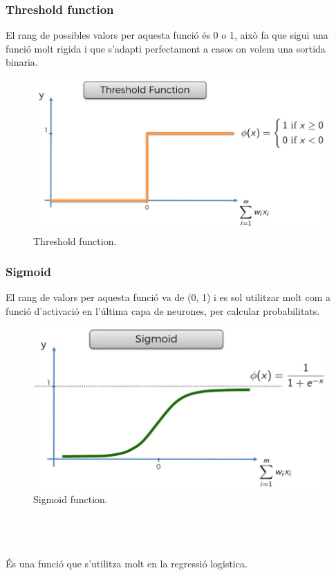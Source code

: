 \documentclass[12pt]{article}
\begin{document}
\subsubsection{Threshold function}
El rang de possibles valors per aquesta funció és 0 o 1, això fa que sigui una funció molt rigida i que s'adapti perfectament a casos on volem una sortida binaria.
\begin{figure}[h!]
	\centering
	\includegraphics[scale=0.3]{imatges/fa/1threshold.png}
	\caption{Threshold function.}
\end{figure}

\subsubsection{Sigmoid}
El rang de valors per aquesta funció va de (0, 1) i es sol utilitzar molt com a funció d'activació en l'última capa de neurones, per calcular probabilitats.
\begin{figure}[h!]
	\centering
	\includegraphics[scale=0.3]{imatges/fa/2sigmoid.png}
	\caption{Sigmoid function.}
\end{figure}
\\\\\\És una funció que s'utilitza molt en la regressió logistica.
\end{document}
